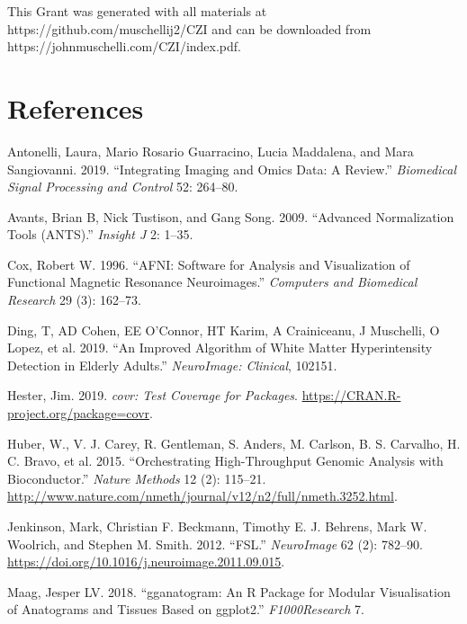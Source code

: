 \documentclass[]{elsarticle} %
\newlength{\cslhangindent}
\newenvironment{cslreferences}%
  {\setlength{\parindent}{0pt}%
  \everypar{\setlength{\hangindent}{\cslhangindent}}\ignorespaces}%
  {\par}
\begin{document}
This Grant was generated with all materials at https://github.com/muschellij2/CZI and can be downloaded from https://johnmuschelli.com/CZI/index.pdf.

\hypertarget{references}{%
\section*{References}\label{references}}

\hypertarget{refs}{}
\begin{cslreferences}
\leavevmode\hypertarget{ref-antonelli2019integrating}{}%
Antonelli, Laura, Mario Rosario Guarracino, Lucia Maddalena, and Mara Sangiovanni. 2019. ``Integrating Imaging and Omics Data: A Review.'' \emph{Biomedical Signal Processing and Control} 52: 264--80.

\leavevmode\hypertarget{ref-avants2009advanced}{}%
Avants, Brian B, Nick Tustison, and Gang Song. 2009. ``Advanced Normalization Tools (ANTS).'' \emph{Insight J} 2: 1--35.

\leavevmode\hypertarget{ref-afni}{}%
Cox, Robert W. 1996. ``AFNI: Software for Analysis and Visualization of Functional Magnetic Resonance Neuroimages.'' \emph{Computers and Biomedical Research} 29 (3): 162--73.

\leavevmode\hypertarget{ref-ding2019improved}{}%
Ding, T, AD Cohen, EE O'Connor, HT Karim, A Crainiceanu, J Muschelli, O Lopez, et al. 2019. ``An Improved Algorithm of White Matter Hyperintensity Detection in Elderly Adults.'' \emph{NeuroImage: Clinical}, 102151.

\leavevmode\hypertarget{ref-covr}{}%
Hester, Jim. 2019. \emph{covr: Test Coverage for Packages}. \url{https://CRAN.R-project.org/package=covr}.

\leavevmode\hypertarget{ref-bioconductor}{}%
Huber, W., V. J. Carey, R. Gentleman, S. Anders, M. Carlson, B. S. Carvalho, H. C. Bravo, et al. 2015. ``Orchestrating High-Throughput Genomic Analysis with Bioconductor.'' \emph{Nature Methods} 12 (2): 115--21. \url{http://www.nature.com/nmeth/journal/v12/n2/full/nmeth.3252.html}.

\leavevmode\hypertarget{ref-fsl}{}%
Jenkinson, Mark, Christian F. Beckmann, Timothy E. J. Behrens, Mark W. Woolrich, and Stephen M. Smith. 2012. ``FSL.'' \emph{NeuroImage} 62 (2): 782--90. \url{https://doi.org/10.1016/j.neuroimage.2011.09.015}.

\leavevmode\hypertarget{ref-maag2018gganatogram}{}%
Maag, Jesper LV. 2018. ``gganatogram: An R Package for Modular Visualisation of Anatograms and Tissues Based on ggplot2.'' \emph{F1000Research} 7.


\end{cslreferences}
\end{document}
